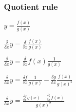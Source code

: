\subsubsection{Quotient rule}

\(y=\frac{f(x)}{g(x)}\)

\(\frac{\delta }{\delta x}y=\frac{\delta }{\delta x}\frac{f(x)}{g(x)}\)

\(\frac{\delta }{\delta x}y=\frac{\delta }{\delta x}f(x)\frac{1}{g(x)}\)

\(\frac{\delta }{\delta x}y=\frac{\delta f}{\delta x}\frac{1}{g(x)}-\frac{\delta g}{\delta x}\frac{f(x)}{g(x)^2}\)

\(\frac{\delta }{\delta x}y=\frac{\frac{\delta f}{\delta x}g(x)-\frac{\delta g}{\delta x}f(x)}{g(x)^2}\)

